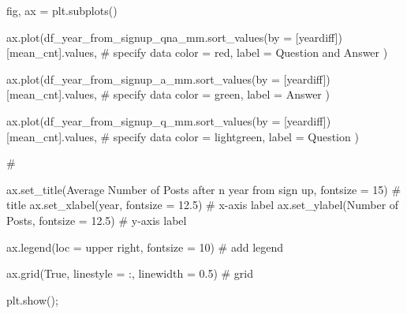 \documentclass[
  letterpaper,
  DIV=11,
  numbers=noendperiod]{scrartcl}
\newenvironment{Shaded}{\begin{snugshade}}{\end{snugshade}}
\newcommand{\CommentTok}[1]{\textcolor[rgb]{0.37,0.37,0.37}{#1}}
\newcommand{\DecValTok}[1]{\textcolor[rgb]{0.68,0.00,0.00}{#1}}
\newcommand{\FloatTok}[1]{\textcolor[rgb]{0.68,0.00,0.00}{#1}}
\newcommand{\NormalTok}[1]{\textcolor[rgb]{0.00,0.23,0.31}{#1}}
\newcommand{\OperatorTok}[1]{\textcolor[rgb]{0.37,0.37,0.37}{#1}}
\newcommand{\StringTok}[1]{\textcolor[rgb]{0.13,0.47,0.30}{#1}}
\newcommand{\VariableTok}[1]{\textcolor[rgb]{0.07,0.07,0.07}{#1}}
\begin{document}
\begin{Shaded}
\begin{Highlighting}[]
\NormalTok{fig, ax }\OperatorTok{=}\NormalTok{ plt.subplots()}


\NormalTok{ax.plot(df\_year\_from\_signup\_qna\_mm.sort\_values(by }\OperatorTok{=}\NormalTok{ [}\StringTok{\textquotesingle{}yeardiff\textquotesingle{}}\NormalTok{])[}\StringTok{\textquotesingle{}mean\_cnt\textquotesingle{}}\NormalTok{].values, }\CommentTok{\# specify data}
\NormalTok{        color }\OperatorTok{=} \StringTok{\textquotesingle{}red\textquotesingle{}}\NormalTok{,}
\NormalTok{        label }\OperatorTok{=} \StringTok{\textquotesingle{}Question and Answer\textquotesingle{}}
\NormalTok{) }

        
\NormalTok{ax.plot(df\_year\_from\_signup\_a\_mm.sort\_values(by }\OperatorTok{=}\NormalTok{ [}\StringTok{\textquotesingle{}yeardiff\textquotesingle{}}\NormalTok{])[}\StringTok{\textquotesingle{}mean\_cnt\textquotesingle{}}\NormalTok{].values, }\CommentTok{\# specify data}
\NormalTok{        color }\OperatorTok{=} \StringTok{\textquotesingle{}green\textquotesingle{}}\NormalTok{,}
\NormalTok{        label }\OperatorTok{=} \StringTok{\textquotesingle{}Answer\textquotesingle{}}
\NormalTok{) }

\NormalTok{ax.plot(df\_year\_from\_signup\_q\_mm.sort\_values(by }\OperatorTok{=}\NormalTok{ [}\StringTok{\textquotesingle{}yeardiff\textquotesingle{}}\NormalTok{])[}\StringTok{\textquotesingle{}mean\_cnt\textquotesingle{}}\NormalTok{].values, }\CommentTok{\# specify data}
\NormalTok{        color }\OperatorTok{=} \StringTok{\textquotesingle{}lightgreen\textquotesingle{}}\NormalTok{,}
\NormalTok{        label }\OperatorTok{=} \StringTok{\textquotesingle{}Question\textquotesingle{}}
\NormalTok{) }

\CommentTok{\# }

\NormalTok{ax.set\_title(}\StringTok{\textquotesingle{}Average Number of Posts after n year from sign up\textquotesingle{}}\NormalTok{, fontsize }\OperatorTok{=} \DecValTok{15}\NormalTok{) }\CommentTok{\# title}
\NormalTok{ax.set\_xlabel(}\StringTok{\textquotesingle{}year\textquotesingle{}}\NormalTok{, fontsize }\OperatorTok{=} \FloatTok{12.5}\NormalTok{) }\CommentTok{\# x{-}axis label}
\NormalTok{ax.set\_ylabel(}\StringTok{\textquotesingle{}Number of Posts\textquotesingle{}}\NormalTok{, fontsize }\OperatorTok{=} \FloatTok{12.5}\NormalTok{) }\CommentTok{\# y{-}axis label}

\NormalTok{ax.legend(loc }\OperatorTok{=} \StringTok{\textquotesingle{}upper right\textquotesingle{}}\NormalTok{, fontsize }\OperatorTok{=} \DecValTok{10}\NormalTok{) }\CommentTok{\# add legend}

\NormalTok{ax.grid(}\VariableTok{True}\NormalTok{, linestyle }\OperatorTok{=} \StringTok{\textquotesingle{}:\textquotesingle{}}\NormalTok{, linewidth }\OperatorTok{=} \FloatTok{0.5}\NormalTok{) }\CommentTok{\# grid}

\NormalTok{plt.show()}\OperatorTok{;}
\end{Highlighting}
\end{Shaded}
\end{document}
